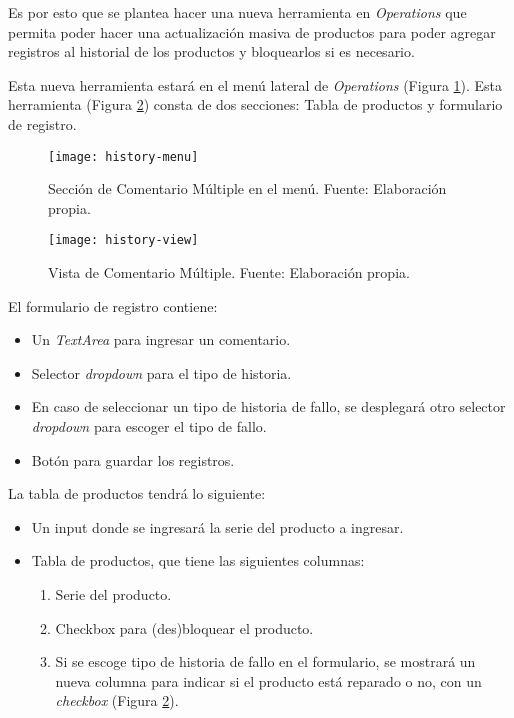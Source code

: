 Es por esto que se plantea hacer una nueva herramienta en \textit{Operations} que permita poder hacer una actualización masiva de productos para poder agregar registros al historial de los productos y bloquearlos si es necesario.

Esta nueva herramienta estará en el menú lateral de \textit{Operations} (Figura \ref{fig:history-menu}). Esta herramienta (Figura \ref{fig:history-view}) consta de dos secciones: Tabla de productos y formulario de registro.

\begin{figure}[H]
	\centering
	\texttt{[image: history-menu]}
	\caption{\label{fig:history-menu} Sección de Comentario Múltiple en el menú. Fuente: Elaboración propia.}
\end{figure}

\begin{figure}[H]
	\centering
	\texttt{[image: history-view]}
	\caption{\label{fig:history-view} Vista de Comentario Múltiple. Fuente: Elaboración propia.}
\end{figure}

El formulario de registro contiene:
\begin{itemize}
    \item Un \textit{TextArea} para ingresar un comentario.
    \item Selector \textit{dropdown} para el tipo de historia.
    \item En caso de seleccionar un tipo de historia de fallo, se desplegará otro selector \textit{dropdown} para escoger el tipo de fallo.
    \item Botón para guardar los registros.
\end{itemize}

La tabla de productos tendrá lo siguiente:

\begin{itemize}
    \item Un input donde se ingresará la serie del producto a ingresar.
    \item Tabla de productos, que tiene las siguientes columnas:
    \begin{enumerate}
        \item Serie del producto.
        \item Checkbox para (des)bloquear el producto.
        \item Si se escoge tipo de historia de fallo en el formulario, se mostrará un nueva columna para indicar si el producto está reparado o no, con un \textit{checkbox} (Figura \ref{fig:history-view}).
    \end{enumerate}    
\end{itemize}

